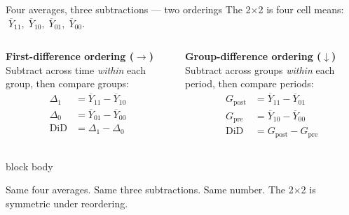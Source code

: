 \documentclass[aspectratio=169,11pt]{beamer}
\newcommand{\emphbox}[1]{%
  \begin{beamercolorbox}[rounded=true,sep=7pt,wd=\linewidth]{block body}%
    \small\color{slate}\raggedright #1%
  \end{beamercolorbox}}
\begin{document}
\begin{frame}{Four averages, three subtractions --- two orderings}
\vspace{0.2em}
\small
The 2$\times$2 is four cell means: $\;\overline{Y}_{11},\;\overline{Y}_{10},\;\overline{Y}_{01},\;\overline{Y}_{00}$.
\vspace{0.4em}
\begin{columns}[T]
\textbf{First-difference ordering ($\rightarrow$)}\\[0.4em]
Subtract across time \textit{within} each group, then compare groups:
\begin{align*}
\Delta_1 &= \overline{Y}_{11} - \overline{Y}_{10} \\
\Delta_0 &= \overline{Y}_{01} - \overline{Y}_{00} \\[2pt]
\text{DiD} &= \Delta_1 - \Delta_0
\end{align*}

\textbf{Group-difference ordering ($\downarrow$)}\\[0.4em]
Subtract across groups \textit{within} each period, then compare periods:
\begin{align*}
G_{\text{post}} &= \overline{Y}_{11} - \overline{Y}_{01} \\
G_{\text{pre}}  &= \overline{Y}_{10} - \overline{Y}_{00} \\[2pt]
\text{DiD} &= G_{\text{post}} - G_{\text{pre}}
\end{align*}
\end{columns}
\vspace{0.3em}
\emphbox{Same four averages. Same three subtractions. Same number. The 2$\times$2 is symmetric under reordering.}
\end{frame}
\end{document}
